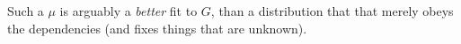 \documentclass{article}
\theoremstyle{plain}
\theoremstyle{definition}
\theoremstyle{remark}
\numberwithin{equation}{section}
\begin{document}
Such a $\mu$ is arguably a \emph{better} fit to $G$, than a distribution that that merely obeys the dependencies (and fixes things that are unknown).
\end{document}
